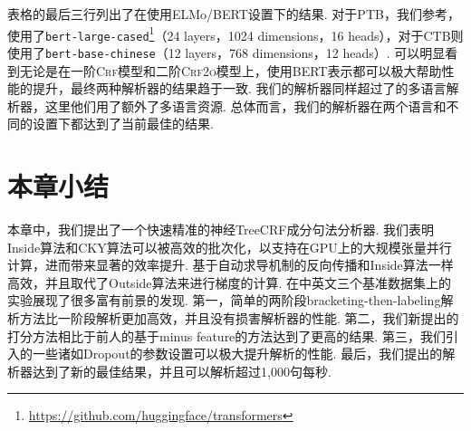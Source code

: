 表格的最后三行列出了在使用ELMo/BERT设置下的结果.
对于PTB，我们参考\citet{kitaev-etal-2019-multilingual}，使用了\texttt{bert-large-cased}\footnote{\url{https://github.com/huggingface/transformers}}（24 layers，1024 dimensions，16 heads），对于CTB则使用了\texttt{bert-base-chinese}（12 layers，768 dimensions，12 heads）.
可以明显看到无论是在一阶\textsc{Crf}模型和二阶\textsc{Crf2o}模型上，使用BERT表示都可以极大帮助性能的提升，最终两种解析器的结果趋于一致.
我们的解析器同样超过了\citet{kitaev-etal-2019-multilingual}的多语言解析器，这里他们用了额外了多语言资源.
总体而言，我们的解析器在两个语言和不同的设置下都达到了当前最佳的结果.

\section{本章小结}\label{sec:con-conclusions}

本章中，我们提出了一个快速精准的神经TreeCRF成分句法分析器.
我们表明Inside算法和CKY算法可以被高效的批次化，以支持在GPU上的大规模张量并行计算，进而带来显著的效率提升.
基于自动求导机制的反向传播和Inside算法一样高效，并且取代了Outside算法来进行梯度的计算.
在中英文三个基准数据集上的实验展现了很多富有前景的发现.
第一，简单的两阶段bracketing-then-labeling解析方法比一阶段解析更加高效，并且没有损害解析器的性能.
第二，我们新提出的打分方法相比于前人的基于minus feature的方法达到了更高的结果.
第三，我们引入的一些诸如Dropout的参数设置可以极大提升解析的性能.
最后，我们提出的解析器达到了新的最佳结果，并且可以解析超过1,000句每秒.
